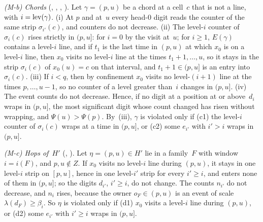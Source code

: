 \begin{outline}
\emph{(M-b) Chords} (, , , ). Let $\gamma=(p,u)$ be
a chord at a cell~$c$ that is not a line, with $i=\mathrm{lev}(\gamma)$. (i) At $p$ and at~$u$ every head-$0$ digit reads the
counter of the same strip $\sigma_{i'}(c)$, and counters do not decrease. (ii) The level-$i$ counter of $\sigma_i(c)$ rises
strictly in $(p,u]$: for $i=0$ by the visit at~$u$; for $i\ge1$, $E(\gamma)$ contains a level-$i$ line, and if $t_1$ is
the last time in $(p,u)$ at which $x_0$ is on a level-$i$ line, then $x_0$ visits no level-$i$ line at the times
$t_1+1,\dots,u$, so it stays in the strip $\sigma_i(c)$ of $x_0(u)=c$ on that interval, and $t_1+1\in(p,u]$ is an entry
into $\sigma_i(c)$. (iii) If $i<q$, then by confinement $x_0$ visits
no level-$(i+1)$ line at the times $p,\dots,u-1$, so no counter of a level greater than~$i$ changes in $(p,u]$. (iv) The
event counts do not decrease. Hence, if no digit at a position at or above~$d_i$ wraps in $(p,u]$, the most significant
digit whose count changed has risen without wrapping, and $\Psi(u)>\Psi(p)$. By~(iii), $\gamma$ is violated only if
\textup{(c1)} the level-$i$ counter of $\sigma_i(c)$ wraps at a time in $(p,u]$, or \textup{(c2)} some $e_{i'}$ with
$i'>i$ wraps in $(p,u]$.

\emph{(M-c) Hops of~$H'$} (, ). Let $\eta=(p,u)\in H'$ lie in a family~$F$ with window
$i=i(F)$, and $p,u\notin Z$. If $x_0$ visits no level-$i$ line during $(p,u)$, it stays in one level-$i$ strip on $[p,u]$,
hence in one level-$i'$ strip for every $i'\ge i$, and enters none of them in $(p,u]$; so the digits $d_{i'}$, $i'\ge i$, do
not change. The counts $n_{i'}$ do not decrease, and $n_i$ rises, because the owner $o_F\in(p,u)$ is an event of scale
$\lambda(d_F)\ge\beta_i$. So $\eta$ is violated only if \textup{(d1)} $x_0$ visits a level-$i$ line during $(p,u)$, or
\textup{(d2)} some $e_{i'}$ with $i'\ge i$ wraps in $(p,u]$.


\end{outline}
